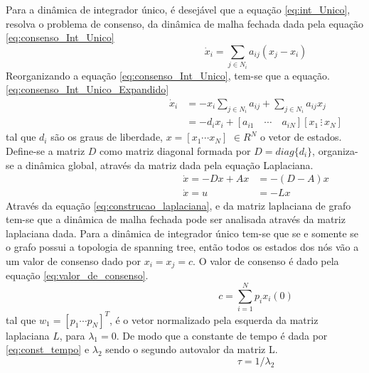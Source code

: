 Para a dinâmica de integrador único, é desejável que a equação \ref{eq:int_Unico}, resolva o problema de consenso, da dinâmica de malha fechada dada pela equação \ref{eq:consenso_Int_Unico}
\begin{equation}\label{eq:consenso_Int_Unico}
\hspace{6cm} %
    \dot x_{i} = \sum\limits_{j \in N_{i}} a_{ij} (x_{j} - x_{i})
\end{equation}
Reorganizando a equação \ref{eq:consenso_Int_Unico}, tem-se que a equação. \ref{eq:consenso_Int_Unico_Expandido}
\begin{equation}\label{eq:consenso_Int_Unico_Expandido}
\hspace{6cm} %
    \begin{split}
        \dot x_{i} &= -x_{i}\sum\limits_{j \in N_{i}} a_{ij} + 
        \sum\limits_{j \in N_{i}} a_{ij}x_{j} \\
        &= -d_{i}x_{i} + 
        \left[ a_{i1} \quad \cdots \quad a_{iN} \right] 
        \left[ x_{1} \, \vdots \, x_{N} \right]
    \end{split}
\end{equation}
tal que $d_{i}$ são os graus de liberdade, $x = [x_{1} \cdots x_{N}]$ $\in R^N$ o vetor de estados. Define-se a matriz $D$ como matriz diagonal formada por $D = diag \{d_{i}\}$, organiza-se a 
dinâmica global, através da matriz dada pela equação Laplaciana.
\begin{equation}
\label{eq:construcao_laplaciana}
\hspace{6cm} %
    \begin{split}
        \dot x = -Dx +Ax &= -(D-A)x \\
        \dot x = u &= -Lx 
    \end{split}
\end{equation}
Através da equação \ref{eq:construcao_laplaciana}, e da matriz laplaciana de grafo tem-se que a dinâmica de malha fechada pode ser analisada através da matriz laplaciana dada.
Para a dinâmica de integrador único tem-se que se e somente se o grafo possui a topologia de spanning tree, então todos os estados dos nós vão a um valor de consenso dado por $x_{i} = x_{j} = c$. O valor de consenso é dado pela equação \ref{eq:valor_de_consenso}.
\begin{equation}\label{eq:valor_de_consenso} 
\hspace{6cm} %
c = \sum\limits_{i = 1}^{N} p_{i}x_{i}(0)
\end{equation}
tal que $w_{1} = [p_{1} \cdots p_{N}]^{T}$, é o vetor normalizado pela esquerda da matriz laplaciana $L$, para $  \lambda_{1} = 0$. De modo que a constante de tempo é dada por \ref{eq:const_tempo} e $\lambda_{2}$ sendo o segundo autovalor da matriz L.
\begin{equation}\label{eq:const_tempo}
\hspace{6cm} %
   \tau = 1 / \lambda_{2}
\end{equation}


